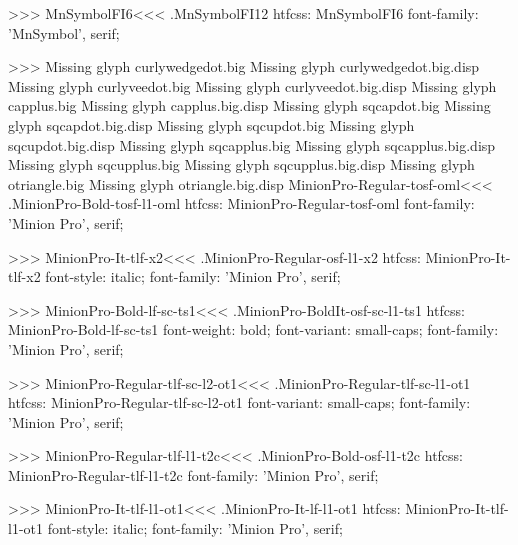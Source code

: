 {>>>
\<MnSymbolFI6\><<<
.MnSymbolFI12
htfcss:  MnSymbolFI6  font-family: 'MnSymbol', serif;

>>>
Missing glyph	curlywedgedot.big
Missing glyph	curlywedgedot.big.disp
Missing glyph	curlyveedot.big
Missing glyph	curlyveedot.big.disp
Missing glyph	capplus.big
Missing glyph	capplus.big.disp
Missing glyph	sqcapdot.big
Missing glyph	sqcapdot.big.disp
Missing glyph	sqcupdot.big
Missing glyph	sqcupdot.big.disp
Missing glyph	sqcapplus.big
Missing glyph	sqcapplus.big.disp
Missing glyph	sqcupplus.big
Missing glyph	sqcupplus.big.disp
Missing glyph	otriangle.big
Missing glyph	otriangle.big.disp
\<MinionPro-Regular-tosf-oml\><<<
.MinionPro-Bold-tosf-l1-oml
htfcss:  MinionPro-Regular-tosf-oml  font-family: 'Minion Pro', serif;

>>>
\<MinionPro-It-tlf-x2\><<<
.MinionPro-Regular-osf-l1-x2
htfcss:  MinionPro-It-tlf-x2  font-style: italic; font-family: 'Minion Pro', serif;

>>>
\<MinionPro-Bold-lf-sc-ts1\><<<
.MinionPro-BoldIt-osf-sc-l1-ts1
htfcss:  MinionPro-Bold-lf-sc-ts1  font-weight: bold; font-variant: small-caps; font-family: 'Minion Pro', serif;

>>>
\<MinionPro-Regular-tlf-sc-l2-ot1\><<<
.MinionPro-Regular-tlf-sc-l1-ot1
htfcss:  MinionPro-Regular-tlf-sc-l2-ot1  font-variant: small-caps; font-family: 'Minion Pro', serif;

>>>
\<MinionPro-Regular-tlf-l1-t2c\><<<
.MinionPro-Bold-osf-l1-t2c
htfcss:  MinionPro-Regular-tlf-l1-t2c  font-family: 'Minion Pro', serif;

>>>
\<MinionPro-It-tlf-l1-ot1\><<<
.MinionPro-It-lf-l1-ot1
htfcss:  MinionPro-It-tlf-l1-ot1  font-style: italic; font-family: 'Minion Pro', serif;

}
